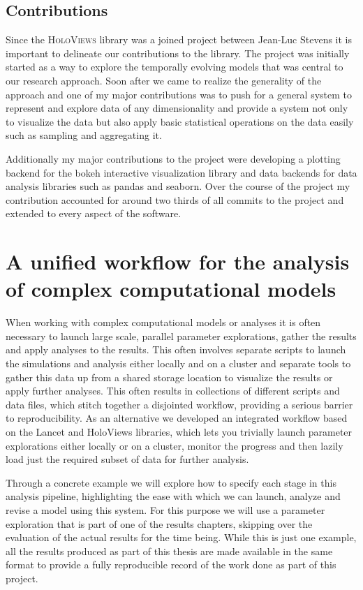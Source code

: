 \subsection{Contributions}

Since the \textsc{HoloViews} library was a joined project between
Jean-Luc Stevens it is important to delineate our contributions to the
library. The project was initially started as a way to explore the
temporally evolving models that was central to our research
approach. Soon after we came to realize the generality of the approach
and one of my major contributions was to push for a general system to
represent and explore data of any dimensionality and provide a system
not only to visualize the data but also apply basic statistical
operations on the data easily such as sampling and aggregating it.

Additionally my major contributions to the project were developing a
plotting backend for the bokeh interactive visualization library and
data backends for data analysis libraries such as pandas and
seaborn. Over the course of the project my contribution accounted for
around two thirds of all commits to the project and extended to every
aspect of the software.

\section{A unified workflow for the analysis of complex computational models}

When working with complex computational models or analyses it is often
necessary to launch large scale, parallel parameter explorations,
gather the results and apply analyses to the results. This often
involves separate scripts to launch the simulations and analysis
either locally and on a cluster and separate tools to gather this data
up from a shared storage location to visualize the results or apply
further analyses. This often results in collections of different
scripts and data files, which stitch together a disjointed workflow,
providing a serious barrier to reproducibility. As an alternative we
developed an integrated workflow based on the Lancet and HoloViews
libraries, which lets you trivially launch parameter explorations
either locally or on a cluster, monitor the progress and then lazily
load just the required subset of data for further analysis.

Through a concrete example we will explore how to specify each stage in
this analysis pipeline, highlighting the ease with which we can
launch, analyze and revise a model using this system. For this purpose
we will use a parameter exploration that is part of one of the results
chapters, skipping over the evaluation of the actual results for the
time being. While this is just one example, all the results produced
as part of this thesis are made available in the same format to
provide a fully reproducible record of the work done as part of this
project.


